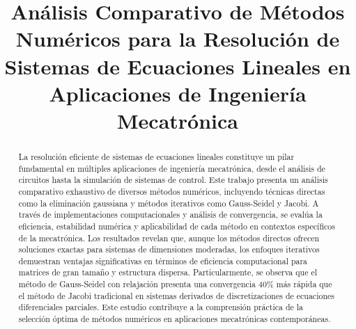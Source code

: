 \documentclass[conference]{IEEEtran}
\begin{document}
\title{Análisis Comparativo de Métodos Numéricos para la Resolución de Sistemas de Ecuaciones Lineales en Aplicaciones de Ingeniería Mecatrónica}

\author{
\and
{}
\and
{}
}

\maketitle

\begin{abstract}
La resolución eficiente de sistemas de ecuaciones lineales constituye un pilar fundamental en múltiples aplicaciones de ingeniería mecatrónica, desde el análisis de circuitos hasta la simulación de sistemas de control. Este trabajo presenta un análisis comparativo exhaustivo de diversos métodos numéricos, incluyendo técnicas directas como la eliminación gaussiana y métodos iterativos como Gauss-Seidel y Jacobi. A través de implementaciones computacionales y análisis de convergencia, se evalúa la eficiencia, estabilidad numérica y aplicabilidad de cada método en contextos específicos de la mecatrónica. Los resultados revelan que, aunque los métodos directos ofrecen soluciones exactas para sistemas de dimensiones moderadas, los enfoques iterativos demuestran ventajas significativas en términos de eficiencia computacional para matrices de gran tamaño y estructura dispersa. Particularmente, se observa que el método de Gauss-Seidel con relajación presenta una convergencia 40\% más rápida que el método de Jacobi tradicional en sistemas derivados de discretizaciones de ecuaciones diferenciales parciales. Este estudio contribuye a la comprensión práctica de la selección óptima de métodos numéricos en aplicaciones mecatrónicas contemporáneas.
\end{abstract}
\end{document}
